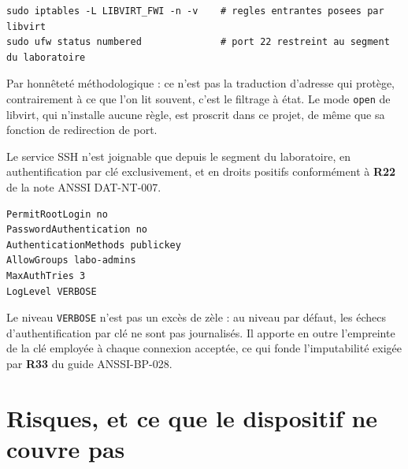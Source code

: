 \documentclass[11pt,a4paper]{article}
\newcommand{\ttb}[1]{\texttt{\small #1}}
\newcommand{\anssi}[1]{\textcolor{primary}{\textbf{#1}}}
\begin{document}
\begin{lstlisting}
sudo iptables -L LIBVIRT_FWI -n -v    # regles entrantes posees par libvirt
sudo ufw status numbered              # port 22 restreint au segment du laboratoire
\end{lstlisting}

Par honnêteté méthodologique : ce n'est pas la traduction d'adresse qui protège,
contrairement à ce que l'on lit souvent, c'est le filtrage à état. Le mode
\ttb{open} de libvirt, qui n'installe aucune règle, est proscrit dans ce projet,
de même que sa fonction de redirection de port.

Le service SSH n'est joignable que depuis le segment du laboratoire, en
authentification par clé exclusivement, et en droits positifs conformément à
\anssi{R22} de la note ANSSI DAT-NT-007.

\begin{lstlisting}
PermitRootLogin no
PasswordAuthentication no
AuthenticationMethods publickey
AllowGroups labo-admins
MaxAuthTries 3
LogLevel VERBOSE
\end{lstlisting}

Le niveau \ttb{VERBOSE} n'est pas un excès de zèle : au niveau par défaut, les
échecs d'authentification par clé ne sont pas journalisés. Il apporte en outre
l'empreinte de la clé employée à chaque connexion acceptée, ce qui fonde
l'imputabilité exigée par \anssi{R33} du guide ANSSI-BP-028.

\section{Risques, et ce que le dispositif ne couvre pas}
\label{sec:risques}
\end{document}
